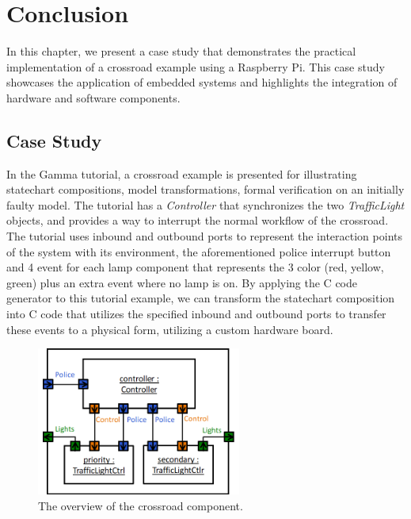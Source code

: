 \chapter{Conclusion}

In this chapter, we present a case study that demonstrates the practical implementation of a crossroad example using a Raspberry Pi\cite{Raspberry}. This case study showcases the application of embedded systems and highlights the integration of hardware and software components.

\section{Case Study}

In the Gamma tutorial, a crossroad example is presented for illustrating statechart compositions, model transformations, formal verification on an initially faulty model. The tutorial has a \textit{Controller} that synchronizes the two \textit{TrafficLight} objects, and provides a way to interrupt the normal workflow of the crossroad. The tutorial uses inbound and outbound ports to represent the interaction points of the system with its environment, the aforementioned police interrupt button and 4 event for each lamp component that represents the 3 color (red, yellow, green) plus an extra event where no lamp is on. By applying the C code generator to this tutorial example, we can transform the statechart composition into C code that utilizes the specified inbound and outbound ports to transfer these events to a physical form, utilizing a custom hardware board.

\begin{figure}[h]
	\centering
	\includegraphics[width=0.6\textwidth]{images/crossroad-component.png}
	\caption{The overview of the crossroad component.}
	\label{fig:crossroad}
\end{figure}

